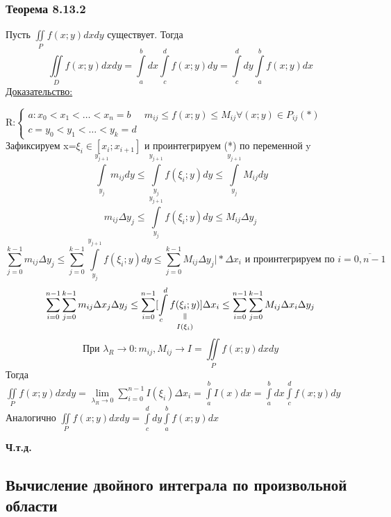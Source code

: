 \documentclass[12pt]{article}
\newcommand{\verteq}{\rotatebox{90}{$\,=$}}
\newcommand{\equalto}[2]{\underset{\scriptstyle\overset{\mkern4mu\verteq}{#2}}{#1}}
\let\oldint\int
\let\oldiint\iint
\let\oldsum\sum
\let\oldlim\lim
\renewcommand{\int}{\oldint\limits}
\renewcommand{\iint}{\oldiint\limits}
\renewcommand{\sum}{\oldsum\limits}
\renewcommand{\lim}{\oldlim\limits}
\begin{document}
  \subsubsection*{Теорема 8.13.2}\label{th:8.13.2}
  \par\noindent
  Пусть $\iint_P f(x;y)dxdy$ существует. Тогда 
  \[\iint_D f(x;y)dxdy=\int_{a}^{b}dx \int_{c}^{d} f(x;y)dy=\int_{c}^{d}dy \int_{a}^{b}f(x;y)dx\]
  \underline{Доказательство:}
  \begin{adjustwidth}{1.5em}{1.5em}
    R:$\begin{cases}
      a:x_0<x_1<\dots<x_n=b & m_{ij}\leq f(x;y) \leq M_{ij} \forall (x;y) \in P_{ij} (*)\\
      c=y_0<y_1<\dots<y_k=d
    \end{cases}$\\
    Зафиксируем x=$\xi_i \in [x_i;x_{i+1}]$ и проинтегрируем (*) по переменной y
    \[\int_{y_j}^{y_{j+1}}m_{ij}dy \leq \int_{y_j}^{y_{j+1}}f(\xi_i;y)dy \leq \int_{y_j}^{y_{j+1}} M_{ij}dy\]
    \[m_{ij}\Delta y_j \leq \int_{y_j}^{y_{j+1}} f (\xi_i;y)dy \leq M_{ij}\Delta y_j\]
    \[\sum_{j=0}^{k-1} m_{ij}\Delta y_j \leq \sum_{j=0}^{k-1}\int_{y_j}^{y_{j+1}}f (\xi_i;y)dy
    \leq \sum_{j=0}^{k-1} M_{ij}\Delta y_j \Big| *\Delta x_i \text{ и проинтегрируем по } 
    i=\overline{0,n-1}\]
    \[\sum_{i=0}^{n-1}\sum_{j=0}^{k-1} m_{ij}\Delta x_j \Delta y_j \leq \sum_{i=0}^{n-1}
    [\int_{c}^{d} \equalto{f (\xi_i;y)}{I(\xi_i)}]\Delta x_i \leq 
    \sum_{i=0}^{n-1} \sum_{j=0}^{k-1} M_{ij} \Delta x_i \Delta y_j\]
    \[\text{При }\lambda_R \to 0: m_{ij},M_{ij} \rightarrow I= \iint_P f(x;y) dxdy\]
    Тогда $\iint_P f(x;y) dxdy = \lim_{\lambda_R \to 0} \sum_{i=0}^{n-1}I(\xi_i)\Delta x_i =
    \int_{a}^{b}I(x)dx=\int_{a}^{b}dx \int_{c}^{d}f(x;y)dy$\\
    Аналогично $\iint_P f(x;y)dxdy=\int_{c}^{d}dy \int_{a}^{b}f(x;y)dx$
    \begin{center}
      \textbf{Ч.т.д.}
    \end{center}
  \end{adjustwidth}
  \subsection{Вычисление двойного интеграла по произвольной области}
\end{document}
